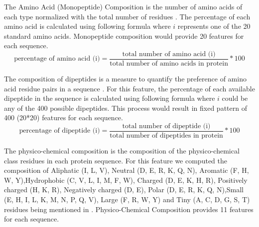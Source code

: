     The Amino Acid (Monopeptide) Composition is the number of amino acids of each type normalized with the total number of 
    residues \cite{gromiha2010protein}. The percentage of each amino acid is calculated using following formula where $i$ 
    represents one of the 20 standard amino acids. Monopeptide composition would provide 20 features for each sequence.
    \begin{equation}
        \text{percentage of amino acid (i)} = \frac {\text{total number of amino acid (i)}} {\text{total number of amino acids in protein}} * 100
    \end{equation} 
    
    The composition of dipeptides is a measure to quantify the preference of amino acid residue pairs in a sequence 
    \cite{gromiha2010protein}. For this feature, the percentage of each available dipeptide in the sequence is calculated using 
    following formula where $i$ could be any of the 400 possible dipeptides. This process would result in fixed pattern of 
    400 (20*20) features for each sequence.  
    \begin{equation}
        \text{percentage of dipeptide (i)} = \frac {\text{total number of dipeptide (i)}} {\text{total number of dipeptides in protein}} * 100
    \end{equation}


    The physico-chemical composition is the composition of the physico-chemical class residues in each protein sequence. 
    For this feature we computed the composition of Aliphatic (I, L, V), Neutral (D, E, R, K, Q, N), 
    Aromatic (F, H, W, Y),Hydrophobic (C, V, L, I, M, F, W), Charged (D, E, K, H, R), 
    Positively charged (H, K, R), Negatively charged (D, E), Polar (D, E, R, K, Q, N),Small (E, H, I, L, K, M, N, P, Q, V), 
    Large (F, R, W, Y) and Tiny (A, C, D, G, S, T) residues being mentioned in \cite{mishra2014prediction}. 
    Physico-Chemical Composition provides 11 features for each sequence.\\

